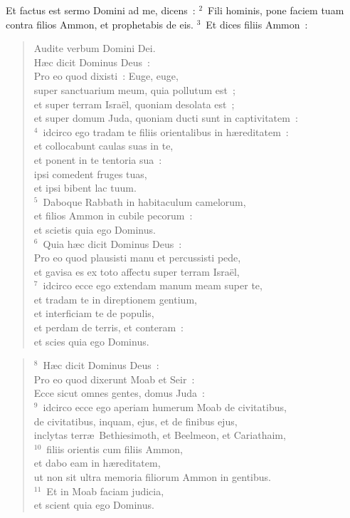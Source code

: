\bchapter
\lettrine[lines=3,image=true,loversize=0.05,lraise=-0.03]{E}{}t factus est sermo Domini ad me, dicens~:
${}^{2}$~Fili hominis, pone faciem tuam contra filios Ammon, et prophetabis de eis.
${}^{3}$~Et dices filiis Ammon~: \begin{flushleft}\begin{verse}Audite verbum Domini Dei.\\ H\ae c dicit Dominus Deus~:\\ Pro eo quod dixisti~: Euge, euge,\\ super sanctuarium meum, quia pollutum est~;\\ et super terram Isra\"el, quoniam desolata est~;\\ et super domum Juda, quoniam ducti sunt in captivitatem~:\\
${}^{4}$~idcirco ego tradam te filiis orientalibus in h\ae reditatem~:\\ et collocabunt caulas suas in te,\\ et ponent in te tentoria sua~:\\ ipsi comedent fruges tuas,\\ et ipsi bibent lac tuum.\\
${}^{5}$~Daboque Rabbath in habitaculum camelorum,\\ et filios Ammon in cubile pecorum~:\\ et scietis quia ego Dominus.\\
${}^{6}$~Quia h\ae c dicit Dominus Deus~:\\ Pro eo quod plausisti manu et percussisti pede,\\ et gavisa es ex toto affectu super terram Isra\"el,\\
${}^{7}$~idcirco ecce ego extendam manum meam super te,\\ et tradam te in direptionem gentium,\\ et interficiam te de populis,\\ et perdam de terris, et conteram~:\\ et scies quia ego Dominus.\end{verse}\end{flushleft}


\begin{flushleft}\begin{verse}${}^{8}$~H\ae c dicit Dominus Deus~:\\ Pro eo quod dixerunt Moab et Seir~:\\ Ecce sicut omnes gentes, domus Juda~:\\
${}^{9}$~idcirco ecce ego aperiam humerum Moab de civitatibus,\\ de civitatibus, inquam, ejus, et de finibus ejus,\\ inclytas terr\ae\ Bethiesimoth, et Beelmeon, et Cariathaim,\\
${}^{10}$~filiis orientis cum filiis Ammon,\\ et dabo eam in h\ae reditatem,\\ ut non sit ultra memoria filiorum Ammon in gentibus.\\
${}^{11}$~Et in Moab faciam judicia,\\ et scient quia ego Dominus.\end{verse}\end{flushleft}


